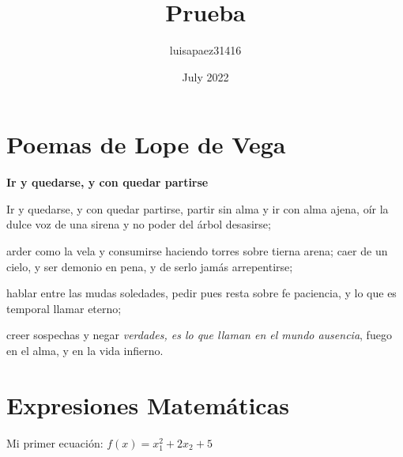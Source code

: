\documentclass[12pt]{article}
\title{Prueba}
\author{luisapaez31416 }
\date{July 2022}
\begin{document}
\maketitle

\section{Poemas de Lope de Vega}

\textbf{Ir y quedarse, y con quedar partirse}
 
Ir y quedarse, y con quedar partirse,
partir sin alma y ir con alma ajena,
oír la dulce voz de una sirena
y no poder del árbol desasirse;

arder como la vela y consumirse
haciendo torres sobre tierna arena;
caer de un cielo, y ser demonio en pena,
y de serlo jamás arrepentirse;

\begin{center}
hablar entre las mudas soledades,
pedir pues resta sobre fe paciencia,
y lo que es temporal llamar eterno;
\end{center}

creer sospechas y negar \textit{verdades,
es lo que llaman en el mundo ausencia},
fuego en el alma, y en la vida infierno.


\newpage

\section{Expresiones Matemáticas}


Mi primer ecuación: $f(x) = x^{2}_{1} + 2x_{2}+5$

\vspace{0.5cm}
\end{document}
